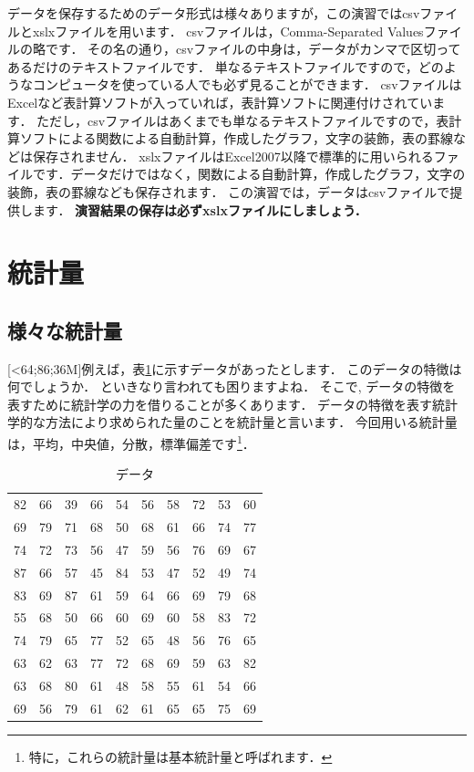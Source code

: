 データを保存するためのデータ形式は様々ありますが，この演習ではcsvファイルとxslxファイルを用います．
csvファイルは，Comma-Separated Valuesファイルの略です．
その名の通り，csvファイルの中身は，データがカンマで区切ってあるだけのテキストファイルです．
単なるテキストファイルですので，どのようなコンピュータを使っている人でも必ず見ることができます．
csvファイルはExcelなど表計算ソフトが入っていれば，表計算ソフトに関連付けされています．
ただし，csvファイルはあくまでも単なるテキストファイルですので，表計算ソフトによる関数による自動計算，作成したグラフ，文字の装飾，表の罫線などは保存されません．
xslxファイルはExcel2007以降で標準的に用いられるファイルです．データだけではなく，関数による自動計算，作成したグラフ，文字の装飾，表の罫線なども保存されます．
この演習では，データはcsvファイルで提供します．
\textbf{演習結果の保存は必ずxslxファイルにしましょう．}

\section{統計量}

\subsection{様々な統計量}

[<64;86;36M]例えば，表\ref{tab:sample}に示すデータがあったとします．
このデータの特徴は何でしょうか．
といきなり言われても困りますよね．
そこで, データの特徴を表すために統計学の力を借りることが多くあります．
データの特徴を表す統計学的な方法により求められた量のことを統計量と言います．
今回用いる統計量は，平均，中央値，分散，標準偏差です\footnote{特に，これらの統計量は基本統計量と呼ばれます．}．

\begin{table}[tb]
    \caption{データ}
    \centering
    \begin{tabular}{cccccccccc}
       82 & 66 & 39 & 66 & 54 & 56 & 58 & 72 & 53 & 60 \\
       69 & 79 & 71 & 68 & 50 & 68 & 61 & 66 & 74 & 77 \\
       74 & 72 & 73 & 56 & 47 & 59 & 56 & 76 & 69 & 67 \\
       87 & 66 & 57 & 45 & 84 & 53 & 47 & 52 & 49 & 74 \\
       83 & 69 & 87 & 61 & 59 & 64 & 66 & 69 & 79 & 68 \\
       55 & 68 & 50 & 66 & 60 & 69 & 60 & 58 & 83 & 72 \\
       74 & 79 & 65 & 77 & 52 & 65 & 48 & 56 & 76 & 65 \\
       63 & 62 & 63 & 77 & 72 & 68 & 69 & 59 & 63 & 82 \\
       63 & 68 & 80 & 61 & 48 & 58 & 55 & 61 & 54 & 66 \\
       69 & 56 & 79 & 61 & 62 & 61 & 65 & 65 & 75 & 69 \\
    \end{tabular}
    \label{tab:sample}
\end{table}

